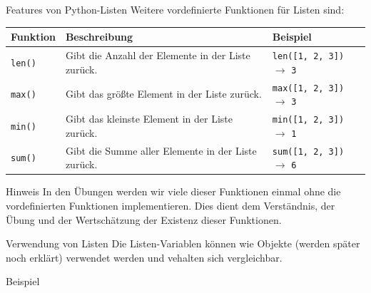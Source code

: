 \documentclass[xelatex,aspectratio=169]{beamer}
\begin{document}
\begin{frame}{Features von Python-Listen}
  Weitere vordefinierte Funktionen für Listen sind:
  \begin{tabularx}{\textwidth}{lXl}
    \toprule
    \textbf{Funktion} & \textbf{Beschreibung}                              & \textbf{Beispiel}                                \\
    \midrule
    \texttt{len()}    & Gibt die Anzahl der Elemente in der Liste zurück.  & \texttt{len([1, 2, 3])} $\rightarrow$ \texttt{3} \\
    \texttt{max()}    & Gibt das größte Element in der Liste zurück.       & \texttt{max([1, 2, 3])} $\rightarrow$ \texttt{3} \\
    \texttt{min()}    & Gibt das kleinste Element in der Liste zurück.     & \texttt{min([1, 2, 3])} $\rightarrow$ \texttt{1} \\
    \texttt{sum()}    & Gibt die Summe aller Elemente in der Liste zurück. & \texttt{sum([1, 2, 3])} $\rightarrow$ \texttt{6} \\
    \bottomrule
  \end{tabularx}

  \begin{exampleblock}{Hinweis}
    In den Übungen werden wir viele dieser Funktionen einmal ohne die vordefinierten Funktionen implementieren.
    Dies dient dem Verständnis, der Übung und der Wertschätzung der Existenz dieser Funktionen.
  \end{exampleblock}
\end{frame}

\begin{frame}{Verwendung von Listen}
  Die Listen-Variablen können wie Objekte (werden später noch erklärt) verwendet werden und vehalten sich vergleichbar.

  \begin{exampleblock}{Beispiel}
    \inputminted[escapeinside=??]{python}{src/algorithmus_list_methods.py}

  \end{exampleblock}

\end{frame}


\end{document}
